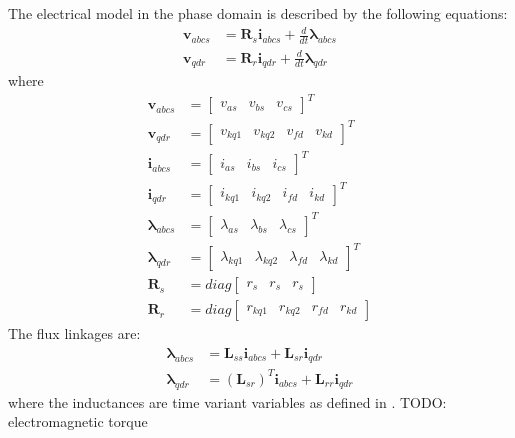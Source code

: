 The electrical model in the phase domain is described by the following equations:
%
\begin{align}
  \mathbf{v}_{abcs} &= \mathbf{R}_s \mathbf{i}_{abcs} + \frac{d}{dt} \boldsymbol{\lambda}_{abcs} \\
  \mathbf{v}_{qdr} &= \mathbf{R}_r \mathbf{i}_{qdr} + \frac{d}{dt}  \boldsymbol{\lambda}_{qdr}
\end{align}
%
where
%
\begin{align}
  \mathbf{v}_{abcs} &= 
  \begin{bmatrix}
    v_{as} & v_{bs} & v_{cs}
  \end{bmatrix}^T \\
  \mathbf{v}_{qdr} &= 
  \begin{bmatrix}
    v_{kq1} & v_{kq2} & v_{fd} & v_{kd} 
  \end{bmatrix}^T \\
  \mathbf{i}_{abcs} &= 
  \begin{bmatrix}
    i_{as} & i_{bs} & i_{cs}
  \end{bmatrix}^T \\
  \mathbf{i}_{qdr} &= 
  \begin{bmatrix}
    i_{kq1} & i_{kq2} & i_{fd} & i_{kd} 
  \end{bmatrix}^T \\
  \boldsymbol{\lambda}_{abcs} &= 
  \begin{bmatrix}
    \lambda_{as} & \lambda_{bs} & \lambda_{cs}
  \end{bmatrix}^T \\
  \boldsymbol{\lambda}_{qdr} &= 
  \begin{bmatrix}
    \lambda_{kq1} & \lambda_{kq2} & \lambda_{fd} & \lambda_{kd} 
  \end{bmatrix}^T \\
  \mathbf{R}_s &= diag
  \begin{bmatrix}
    r_s & r_s & r_s 
  \end{bmatrix} \\
  \mathbf{R}_r &= diag
  \begin{bmatrix}
    r_{kq1} & r_{kq2} & r_{fd} & r_{kd}
  \end{bmatrix}
\end{align}
%
The flux linkages are:
%
\begin{align}
  \boldsymbol{\lambda}_{abcs} &= \mathbf{L}_{ss} \mathbf{i}_{abcs} + \mathbf{L}_{sr} \mathbf{i}_{qdr}  \\
  \boldsymbol{\lambda}_{qdr} &= (\mathbf{L}_{sr})^T \mathbf{i}_{abcs} + \mathbf{L}_{rr} \mathbf{i}_{qdr}
\end{align}
%
where the inductances are time variant variables as defined in \cite{krause2002sudhoff}.
TODO: electromagnetic torque

